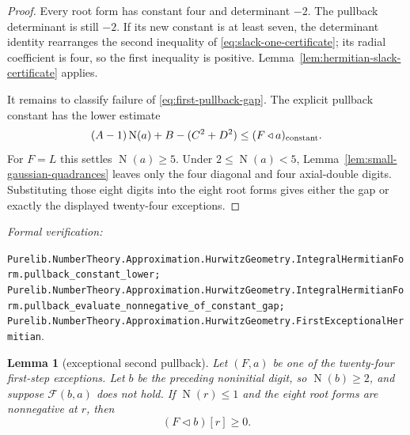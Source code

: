 \documentclass[11pt]{article}
\newtheorem{lemma}[lemma]{Lemma}
\newcommand{\Norm}[1]{\operatorname{N}\!\left(#1\right)}
\newcommand{\leanref}[1]{\par\smallskip\noindent
  \emph{Formal verification:}\par\nobreak
  {\raggedright\nolinkurl{#1}.\par}}
\begin{document}
\begin{proof}
Every root form has constant four and determinant $-2$.  The pullback
determinant is still $-2$.  If its new constant is at least seven, the
determinant identity rearranges the second inequality of
\eqref{eq:slack-one-certificate}; its radial coefficient is four, so the
first inequality is positive.  Lemma~\ref{lem:hermitian-slack-certificate}
applies.

It remains to classify failure of \eqref{eq:first-pullback-gap}.  The
explicit pullback constant has the lower estimate
\[
 (A-1)\Norm a+B-(C^2+D^2)
       \le (F\mathbin{\triangleleft}a)_{\rm constant}.
\]
For $F=L$ this settles $\Norm a\ge5$.  Under
$2\le\Norm a<5$, Lemma~\ref{lem:small-gaussian-quadrances} leaves only the
four diagonal and four axial-double digits.  Substituting those eight digits
into the eight root forms gives either the gap or exactly the displayed
twenty-four exceptions.
\end{proof}

\leanref{Purelib.NumberTheory.Approximation.HurwitzGeometry.IntegralHermitianForm.pullback_constant_lower;
Purelib.NumberTheory.Approximation.HurwitzGeometry.IntegralHermitianForm.pullback_evaluate_nonnegative_of_constant_gap;
Purelib.NumberTheory.Approximation.HurwitzGeometry.FirstExceptionalHermitian}

\begin{lemma}[exceptional second pullback]
\label{lem:exceptional-second-pullback}
Let $(F,a)$ be one of the twenty-four first-step exceptions.  Let $b$ be the
preceding noninitial digit, so $\Norm b\ge2$, and suppose
$\mathcal F(b,a)$ does not hold.  If $\Norm r\le1$ and the eight root forms
are nonnegative at $r$, then
\begin{equation}
\label{eq:exceptional-second-pullback}
                       (F\mathbin{\triangleleft}b)[r]\ge0.
\end{equation}
\end{lemma}
\end{document}
